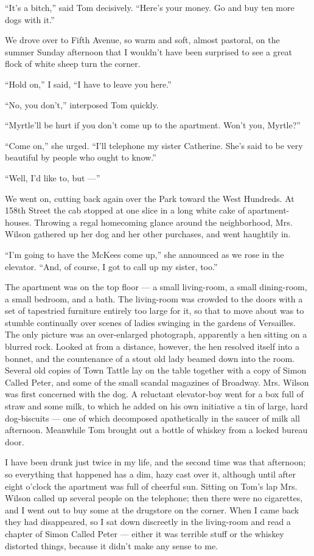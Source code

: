 \documentclass{znotebook}
\begin{document}
``It's a bitch,'' said Tom decisively. ``Here's your money. Go and buy ten more dogs with it.''

We drove over to Fifth Avenue, so warm and soft, almost pastoral, on the summer Sunday afternoon that I wouldn't have been surprised to see a great flock of white sheep turn the corner.

``Hold on,'' I said, ``I have to leave you here.''

``No, you don't,'' interposed Tom quickly.

``Myrtle'll be hurt if you don't come up to the apartment. Won't you, Myrtle?''

``Come on,'' she urged. ``I'll telephone my sister Catherine. She's said to be very beautiful by people who ought to know.''

``Well, I'd like to, but ---''

We went on, cutting back again over the Park toward the West Hundreds. At 158th Street the cab stopped at one slice in a long white cake of apartment-houses. Throwing a regal homecoming glance around the neighborhood, Mrs. Wilson gathered up her dog and her other purchases, and went haughtily in.

``I'm going to have the McKees come up,'' she announced as we rose in the elevator. ``And, of course, I got to call up my sister, too.''

The apartment was on the top floor ---{} a small living-room, a small dining-room, a small bedroom, and a bath. The living-room was crowded to the doors with a set of tapestried furniture entirely too large for it, so that to move about was to stumble continually over scenes of ladies swinging in the gardens of Versailles. The only picture was an over-enlarged photograph, apparently a hen sitting on a blurred rock. Looked at from a distance, however, the hen resolved itself into a bonnet, and the countenance of a stout old lady beamed down into the room. Several old copies of Town Tattle lay on the table together with a copy of Simon Called Peter, and some of the small scandal magazines of Broadway. Mrs. Wilson was first concerned with the dog. A reluctant elevator-boy went for a box full of straw and some milk, to which he added on his own initiative a tin of large, hard dog-biscuits ---{} one of which decomposed apathetically in the saucer of milk all afternoon. Meanwhile Tom brought out a bottle of whiskey from a locked bureau door.

I have been drunk just twice in my life, and the second time was that afternoon; so everything that happened has a dim, hazy cast over it, although until after eight o'clock the apartment was full of cheerful sun. Sitting on Tom's lap Mrs. Wilson called up several people on the telephone; then there were no cigarettes, and I went out to buy some at the drugstore on the corner. When I came back they had disappeared, so I sat down discreetly in the living-room and read a chapter of Simon Called Peter ---{} either it was terrible stuff or the whiskey distorted things, because it didn't make any sense to me.
\end{document}
